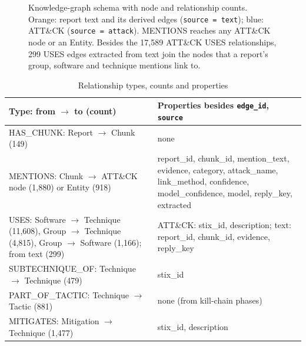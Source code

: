 \documentclass[conference,letterpaper]{IEEEtran}
\newcommand{\code}[1]{\texttt{#1}}
\begin{document}
\begin{figure}[t]
\caption{Knowledge-graph schema with node and relationship counts. Orange: report text and its derived edges (\code{source = text}); blue: ATT\&CK (\code{source = attack}). MENTIONS reaches any ATT\&CK node or an Entity. Besides the 17,589 ATT\&CK USES relationships, 299 USES edges extracted from text join the nodes that a report's group, software and technique mentions link to.}\label{fig:schema}
\end{figure}

\begin{table}[t]\centering\footnotesize
\caption{Relationship types, counts and properties}\label{tab:rels}
\setlength{\tabcolsep}{3pt}
\begin{tabularx}{\linewidth}{@{}>{\raggedright\arraybackslash}p{3.55cm}>{\raggedright\arraybackslash}X@{}}
\toprule
Type: from $\rightarrow$ to (count) & Properties besides \code{edge\_id}, \code{source}\\
\midrule
HAS\_CHUNK: Report $\rightarrow$ Chunk (149) & none\\
MENTIONS: Chunk $\rightarrow$ ATT\&CK node (1,880) or Entity (918) & report\_id, chunk\_id, mention\_text, evidence, category, attack\_name, link\_method, confidence, model\_confidence, model, reply\_key, extracted\\
USES: Software $\rightarrow$ Technique (11,608), Group $\rightarrow$ Technique (4,815), Group $\rightarrow$ Software (1,166); from text (299) & ATT\&CK: stix\_id, description; text: report\_id, chunk\_id, evidence, reply\_key\\
SUBTECHNIQUE\_OF: Technique $\rightarrow$ Technique (479) & stix\_id\\
PART\_OF\_TACTIC: Technique $\rightarrow$ Tactic (881) & none (from kill-chain phases)\\
MITIGATES: Mitigation $\rightarrow$ Technique (1,477) & stix\_id, description\\
\bottomrule
\end{tabularx}
\end{table}
\end{document}
